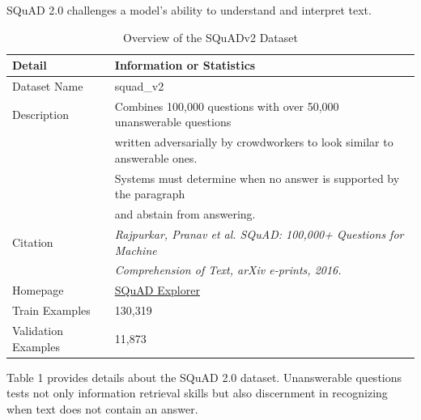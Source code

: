\documentclass[12pt]{extarticle}
\begin{document}
SQuAD 2.0 challenges a model's ability to understand and interpret text.

\begin{table}[h!]
    \centering
    \caption{Overview of the SQuADv2 Dataset}
    \begin{tabular}{@{}ll@{}}
        \toprule
            \textbf{Detail}          & \textbf{Information or Statistics} \\
        \midrule
            Dataset Name & squad\_v2 \\
            Description & Combines 100,000 questions with over 50,000 unanswerable questions \\
                                    & written adversarially by crowdworkers to look similar to answerable ones. \\
                                    & Systems must determine when no answer is supported by the paragraph \\
                                    & and abstain from answering. \\
            Citation                & \textit{Rajpurkar, Pranav et al. SQuAD: 100,000+ Questions for Machine} \\
                                    & \textit{Comprehension of Text, arXiv e-prints, 2016.} \\
            Homepage                & \href{https://rajpurkar.github.io/SQuAD-explorer/}{SQuAD Explorer} \\
        \midrule
            Train Examples          & 130,319 \\
            Validation Examples     & 11,873 \\
        \bottomrule
    \end{tabular}
    \label{tab:my-table}
\end{table}

Table 1 provides details about the SQuAD 2.0 dataset. Unanswerable questions tests not only information retrieval skills but also discernment in recognizing when text does not contain an answer.
\end{document}
